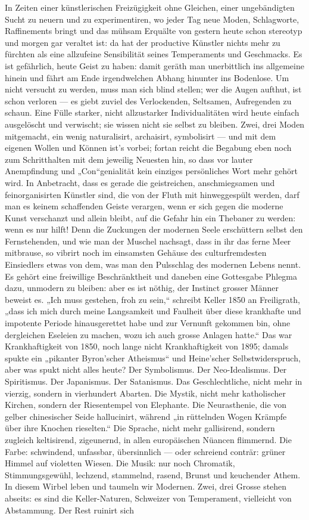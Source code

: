 In Zeiten einer künstlerischen Freizügigkeit ohne Gleichen, einer ungebändigten Sucht zu neuern und zu experimentiren, wo jeder Tag neue Moden, Schlagworte, Raffinements bringt und das mühsam Erquälte von gestern heute schon stereotyp und morgen gar veraltet ist: da hat der productive Künstler nichts mehr zu fürchten als eine allzufeine Sensibilität seines Temperaments und Geschmacks. Es ist gefährlich, heute Geist zu haben: damit geräth man unerbittlich ins allgemeine  hinein und fährt am Ende irgendwelchen Abhang hinunter ins Bodenlose. Um nicht versucht zu werden, muss man sich blind stellen; wer die Augen aufthut, ist schon verloren — es giebt zuviel des Verlockenden, Seltsamen, Aufregenden zu schaun. Eine Fülle starker, nicht allzustarker Individualitäten wird heute einfach ausgelöscht und verwischt; sie wissen nicht sie selbst zu bleiben. Zwei, drei Moden mitgemacht, ein wenig naturalisirt, archaisirt, symbolisirt — und mit dem eigenen Wollen und Können ist’s vorbei; fortan reicht die Begabung eben noch zum Schritthalten mit dem jeweilig Neuesten hin, so dass vor lauter Anempfindung und „Con“genialität kein einziges persönliches Wort mehr gehört wird. In Anbetracht, dass es gerade die geistreichen, anschmiegsamen und feinorganisirten Künstler sind, die von der Fluth mit hinweggespült werden, darf man es keinem schaffenden Geiste verargen, wenn er sich gegen die moderne Kunst verschanzt und allein bleibt, auf die Gefahr hin ein Thebaner zu werden: wenn es nur hilft! Denn die Zuckungen der modernen Seele erschüttern selbst den Fernstehenden, und wie man der Muschel nachsagt, dass in ihr das ferne Meer mitbrause, so vibrirt noch im einsamsten Gehäuse des culturfremdesten Einsiedlers etwas von dem, was man den Pulsschlag des modernen Lebens nennt. Es gehört eine freiwillige Beschränktheit und daneben eine Gottesgabe Phlegma dazu, unmodern zu bleiben: aber es ist nöthig, der Instinct grosser Männer beweist es. „Ich muss gestehen, froh zu sein,“ schreibt Keller 1850 an Freiligrath, „dass ich mich durch meine Langsamkeit und Faulheit über diese krankhafte und impotente Periode hinausgerettet habe und zur Vernunft gekommen bin, ohne dergleichen Eseleien zu machen, wozu ich auch grosse Anlagen hatte.“ Das war Krankhaftigkeit von 1850, noch lange nicht Krankhaftigkeit von 1895; damals spukte ein „pikanter Byron’scher Atheismus“ und Heine’scher Selbstwiderspruch, aber was spukt nicht alles heute? Der Symbolismus. Der Neo-Idealismus. Der Spiritismus. Der Japanismus. Der Satanismus. Das Geschlechtliche, nicht mehr in vierzig, sondern in vierhundert Abarten. Die Mystik, nicht mehr katholischer Kirchen, sondern der Riesentempel von Elephante. Die Neurasthenie, die von gelber chinesischer Seide hallucinirt, während „in rüttelnden Wogen Krämpfe über ihre Knochen rieselten.“ Die Sprache, nicht mehr gallisirend, sondern zugleich keltisirend, zigeunernd, in allen europäischen Nüancen flimmernd. Die Farbe: schwindend, unfassbar, übersinnlich — oder schreiend conträr: grüner Himmel auf violetten Wiesen. Die Musik: nur noch Chromatik, Stimmungsgewühl, lechzend, stammelnd, rasend, Brunst und keuchender Athem. In diesem Wirbel leben und taumeln wir Modernen. Zwei, drei Grosse stehen abseits: es sind die Keller-Naturen, Schweizer von Temperament, vielleicht von Abstammung. Der Rest ruinirt sich 
\par

